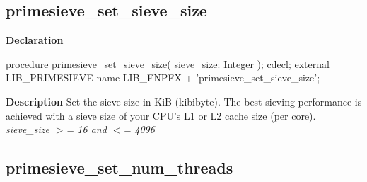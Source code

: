 \documentclass{report}
\newif\ifpdf
\begin{document}
\subsection*{primesieve{\_}set{\_}sieve{\_}size}
\fi
\label{primesieve-primesieve_set_sieve_size}
\begin{list}{}{
\setlength{\itemindent}{0cm}
\setlength{\listparindent}{0cm}
\setlength{\leftmargin}{\evensidemargin}
\addtolength{\leftmargin}{\tmplength}
\settowidth{\labelsep}{X}
\addtolength{\leftmargin}{\labelsep}
\setlength{\labelwidth}{\tmplength}
}
\item[\textbf{Declaration}\hfill]
\ifpdf
\begin{flushleft}
\fi
\begin{ttfamily}
procedure primesieve{\_}set{\_}sieve{\_}size( sieve{\_}size: Integer ); cdecl; external LIB{\_}PRIMESIEVE name LIB{\_}FNPFX + 'primesieve{\_}set{\_}sieve{\_}size';\end{ttfamily}

\ifpdf
\end{flushleft}
\fi

\par
\item[\textbf{Description}]
Set the sieve size in KiB (kibibyte). The best sieving performance is achieved with a sieve size of your CPU's L1 or L2 cache size (per core). \textit{sieve{\_}size {$>$}= 16 and {$<$}= 4096}

\end{list}
\ifpdf
\subsection*{\large{\textbf{primesieve{\_}set{\_}num{\_}threads}}\normalsize\hspace{1ex}\hrulefill}
\else
\end{document}
